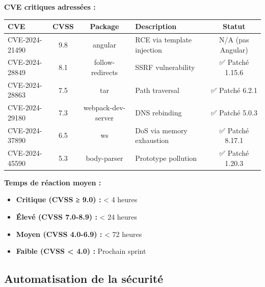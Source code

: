 \begin{tcolorbox}[colback=red!5!white,colframe=red!60!black,title=\textbf{CVE suivies et traitées en 2025}]
\textbf{CVE critiques adressées :}
\begin{center}
\begin{tabular}{|p{3cm}|c|c|p{5cm}|c|}
\hline
\textbf{CVE} & \textbf{CVSS} & \textbf{Package} & \textbf{Description} & \textbf{Statut} \\
\hline
CVE-2024-21490 & 9.8 & angular & RCE via template injection & N/A (pas Angular) \\
\hline
CVE-2024-28849 & 8.1 & follow-redirects & SSRF vulnerability & ✅ Patché 1.15.6 \\
\hline
CVE-2024-28863 & 7.5 & tar & Path traversal & ✅ Patché 6.2.1 \\
\hline
CVE-2024-29180 & 7.3 & webpack-dev-server & DNS rebinding & ✅ Patché 5.0.3 \\
\hline
CVE-2024-37890 & 6.5 & ws & DoS via memory exhaustion & ✅ Patché 8.17.1 \\
\hline
CVE-2024-45590 & 5.3 & body-parser & Prototype pollution & ✅ Patché 1.20.3 \\
\hline
\end{tabular}
\end{center}

\textbf{Temps de réaction moyen :}
\begin{itemize}
    \item \textbf{Critique (CVSS ≥ 9.0) :} < 4 heures
    \item \textbf{Élevé (CVSS 7.0-8.9) :} < 24 heures
    \item \textbf{Moyen (CVSS 4.0-6.9) :} < 72 heures
    \item \textbf{Faible (CVSS < 4.0) :} Prochain sprint
\end{itemize}
\end{tcolorbox}

\subsection{Automatisation de la sécurité}

